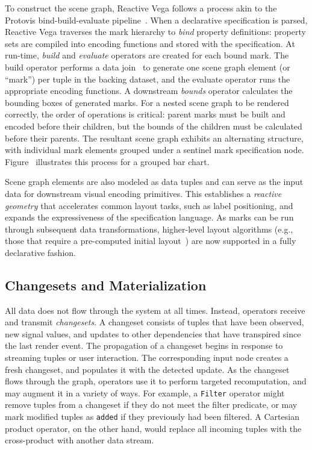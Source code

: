 To construct the scene graph, Reactive Vega follows a process akin to the
Protovis bind-build-evaluate pipeline~\cite{heer:protovisjava}. When a
declarative specification is parsed, Reactive Vega traverses the mark hierarchy
to \emph{bind} property definitions: property sets are compiled into encoding
functions and stored with the specification. At run-time, \emph{build} and
\emph{evaluate} operators are created for each bound mark. The build operator
performs a data join~\cite{bostock:d3} to generate one scene graph element (or
``mark'') per tuple in the backing dataset, and the evaluate operator runs the
appropriate encoding functions. A downstream \emph{bounds} operator calculates
the bounding boxes of generated marks. For a nested scene graph to be rendered
correctly, the order of operations is critical: parent marks must be built and
encoded before their children, but the bounds of the children must be calculated
before their parents. The resultant scene graph exhibits an alternating
structure, with individual mark elements grouped under a sentinel mark
specification node. Figure~ illustrates this process for
a grouped bar chart.

Scene graph elements are also modeled as data tuples and can serve as the input
data for downstream visual encoding primitives. This establishes a
\emph{reactive geometry} that accelerates common layout tasks, such as label
positioning, and expands the expressiveness of the specification language. As
marks can be run through subsequent data transformations, higher-level layout
algorithms (e.g., those that require a pre-computed initial
layout~\cite{flexbox}) are now supported in a fully declarative fashion.

\subsection{Changesets and Materialization}

All data does not flow through the system at all times. Instead, operators
receive and transmit \emph{changesets}. A changeset consists of tuples that have
been observed, new signal values, and updates to other dependencies that have
transpired since the last render event. The propagation of a changeset begins in
response to streaming tuples or user interaction. The corresponding input node
creates a fresh changeset, and populates it with the detected update. As the
changeset flows through the graph, operators use it to perform targeted
recomputation, and may augment it in a variety of ways. For example, a
\texttt{Filter} operator might remove tuples from a changeset if they do not
meet the filter predicate, or may mark modified tuples as \texttt{added} if they
previously had been filtered. A Cartesian product operator, on the other hand,
would replace all incoming tuples with the cross-product with another data
stream.

